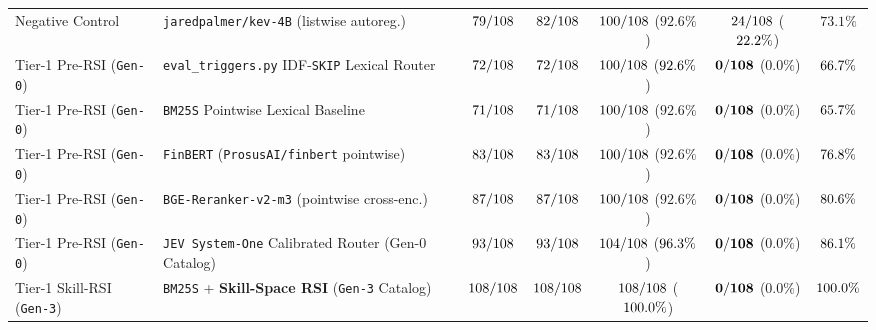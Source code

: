 \begin{table}[t]
{\begin{tabular}{@{}llccccc@{}}
Negative Control & \texttt{jaredpalmer/kev-4B} (listwise autoreg.) & $79/108$ & $82/108$ & $100/108$ ($92.6\%$) & $24/108$ ($22.2\%$) & $73.1\%$ \\
Tier-1 Pre-RSI (\texttt{Gen-0}) & \texttt{eval\_triggers.py} IDF-\texttt{SKIP} Lexical Router & $72/108$ & $72/108$ & $100/108$ ($92.6\%$) & $\mathbf{0/108}$ ($\mathbf{0.0\%}$) & $66.7\%$ \\
Tier-1 Pre-RSI (\texttt{Gen-0}) & \texttt{BM25S} Pointwise Lexical Baseline & $71/108$ & $71/108$ & $100/108$ ($92.6\%$) & $\mathbf{0/108}$ ($\mathbf{0.0\%}$) & $65.7\%$ \\
Tier-1 Pre-RSI (\texttt{Gen-0}) & \texttt{FinBERT} (\texttt{ProsusAI/finbert} pointwise) & $83/108$ & $83/108$ & $100/108$ ($92.6\%$) & $\mathbf{0/108}$ ($\mathbf{0.0\%}$) & $76.8\%$ \\
Tier-1 Pre-RSI (\texttt{Gen-0}) & \texttt{BGE-Reranker-v2-m3} (pointwise cross-enc.) & $87/108$ & $87/108$ & $100/108$ ($92.6\%$) & $\mathbf{0/108}$ ($\mathbf{0.0\%}$) & $80.6\%$ \\
Tier-1 Pre-RSI (\texttt{Gen-0}) & \texttt{JEV System-One} Calibrated Router (Gen-0 Catalog) & $93/108$ & $93/108$ & $104/108$ ($96.3\%$) & $\mathbf{0/108}$ ($\mathbf{0.0\%}$) & $86.1\%$ \\
Tier-1 Skill-RSI (\texttt{Gen-3}) & \texttt{BM25S} + \textbf{Skill-Space RSI} (\texttt{Gen-3} Catalog) & $108/108$ & $108/108$ & $108/108$ ($100.0\%$) & $\mathbf{0/108}$ ($\mathbf{0.0\%}$) & $100.0\%$ \\

\end{tabular}}
\end{table}
